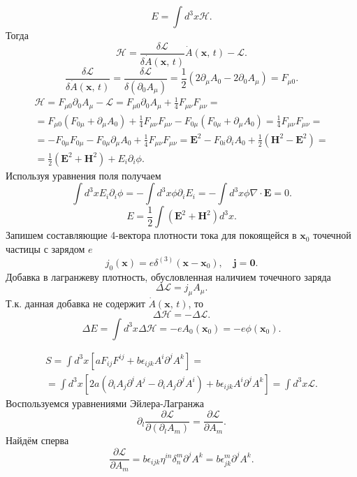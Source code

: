 \documentclass[a4paper]{article}
\begin{document}
\begin{sol}
\[
	E= \int d^3 x \mathcal{H}
.\] 
Тогда
\[
	\mathcal{H}= \frac{\delta \mathcal{L}}{\delta \dot{A}(\mathbf{x},\,t)}\dot{A}(\mathbf{x},\,t)-\mathcal{L}
.\] 
\[
	\frac{\delta \mathcal{L}}{\delta \dot{A}(\mathbf{x},\,t)}=
	\frac{\delta \mathcal{L}}{\delta \left( \partial_0 A_\mu \right) }= \frac{1}{2}\left( 2 \partial_\mu A_0-2 \partial_0 A_\mu \right) =F_{\mu 0}
.\]
\begin{multline*}
	\mathcal{H}=F_{\mu 0}\partial_{0}A_\mu-\mathcal{L}=
	F_{\mu 0} \partial_0 A_\mu +\frac{1}{4} F_{\mu \nu} F_{
	\mu \nu}=\\=
	F_{\mu 0}\left( F_{0\mu}+\partial_\mu A_0 \right) +
	\frac{1}{4}F_{\mu\nu}F_{\mu\nu}
	-F_{0\mu}\left( F_{0\mu}+\partial_\mu A_0 \right) =
	\frac{1}{4} F_{\mu\nu}F_{\mu\nu}=\\=
	-F_{0\mu}F_{0\mu}-F_{0\mu}\partial_\mu A_0+\frac{1}{4}
	F_{\mu\nu}F_{\mu\nu}=
	\mathbf{E}^2- F_{0i} \partial_i A_0+ \frac{1}{2}
	\left( \mathbf{H}^2-\mathbf{E}^2 \right) =\\=
	\frac{1}{2}\left(\mathbf{E}^2+\mathbf{H}^2\right)
	+E_i \partial_i\phi
.\end{multline*} 
Используя уравнения поля получаем
\[
\int d^3x E_i \partial_i \phi=- \int d^3 x\phi \partial_i E_i
=- \int d^3x\phi \nabla \cdot \mathbf{E}=0
.\] 
\[
	E= \frac{1}{2} \int \left( \mathbf{E}^2+\mathbf{H}^2 \right) d^3x
.\]
Запишем составляющие 4-вектора плотности тока для покоящейся в
$\mathbf{x}_0$ точечной
частицы с зарядом $e$
\[
	j_0(\mathbf{x})=e\delta^{(3)}(\mathbf{x}-\mathbf{x}_0),\quad
	\mathbf{j}=\mathbf{0}
.\] 
Добавка в лагранжеву плотность, обусловленная наличием точечного заряда
\[
	\Delta \mathcal{L}=j_\mu A_\mu
.\] 
Т.\:к. данная добавка не содержит $\dot{A}(\mathbf{x},\,t)$, то
\[
	\Delta \mathcal{H}=-\Delta \mathcal{L}
.\] 
\[
	\Delta E=\int d^3 x\Delta \mathcal{H}=-eA_0 (\mathbf{x}_0)
	=-e\phi(\mathbf{x}_0)
.\] 
\end{sol}
\begin{multline*}
S=\int d^3 x \left[ a F_{ij}F^{ij}+b \epsilon_{ijk}A^i \partial^j A^k \right] =\\=
\int d^3 x\left[2a\left(\partial_i A_j \partial^i A^j -\partial_i A_j \partial^j
A^i\right)
+b \epsilon_{ijk}A^i \partial^j A^k\right]=\int d^3x \mathcal{L}
.\end{multline*} 
Воспользуемся уравнениями Эйлера-Лагранжа
\[
	\partial_l \frac{\partial \mathcal{L}}{\partial (\partial_l A_m)}=\frac{\partial \mathcal{L}}{\partial A_m}
.\] 
Найдём сперва
\[
	\frac{\partial \mathcal{L}}{\partial A_m} =
	b\epsilon_{ijk} \eta^{in}\delta^m_n \partial^j A^k=
	b \epsilon_{jk}^m\partial^j A^k
.\] 
\end{document}
